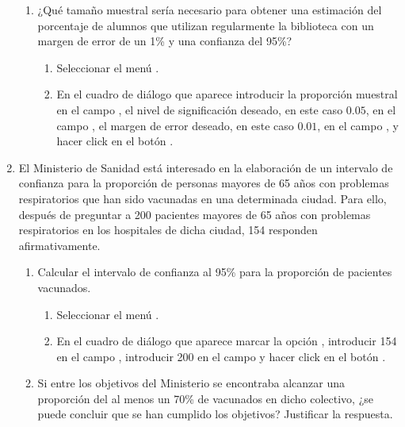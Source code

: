 \begin{enumerate}[leftmargin=*]
\begin{enumerate}
\item ¿Qué tamaño muestral sería necesario para obtener una estimación del porcentaje de alumnos que utilizan regularmente la biblioteca 
con un margen de error de un 1\% y una confianza del 95\%? 
\begin{indicacion}{
\begin{enumerate}
\item Seleccionar el menú .
\item En el cuadro de diálogo que aparece introducir la proporción muestral en el campo , el nivel de significación deseado, en este caso $0.05$, en el campo , el margen de error deseado, en este caso $0.01$, en el campo , y
hacer click en el botón .
\end{enumerate}
}
\end{indicacion}
\end{enumerate}



\item El Ministerio de Sanidad está interesado en la elaboración de un intervalo de confianza para la proporción de
personas mayores de 65 años con problemas respiratorios que han sido vacunadas en una determinada ciudad. Para ello,
después de preguntar a 200 pacientes mayores de 65 años con problemas respiratorios en los hospitales de dicha ciudad,
154 responden afirmativamente.
\begin{enumerate}
\item Calcular el intervalo de confianza al 95\% para la proporción de pacientes vacunados.
\begin{indicacion}{
\begin{enumerate}
\item Seleccionar el menú .
\item En el cuadro de diálogo que aparece marcar la opción , introducir 154 en el campo , introducir 200 en el campo  y hacer click en el botón .
\end{enumerate}}
\end{indicacion}

\item Si entre los objetivos del Ministerio se encontraba alcanzar una proporción del al menos un 70\% de vacunados en
dicho colectivo, ¿se puede concluir que se han cumplido los objetivos? Justificar la respuesta.
\end{enumerate}
\end{enumerate}


